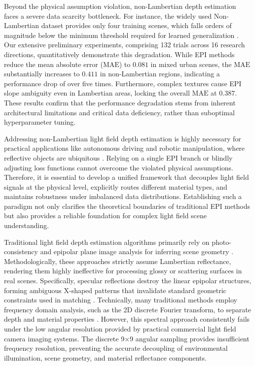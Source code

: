 \documentclass[lettersize,journal]{IEEEtran}
\begin{document}
Beyond the physical assumption violation, non-Lambertian depth estimation faces a severe data scarcity bottleneck. For instance, the widely used Non-Lambertian dataset provides only four training scenes, which falls orders of magnitude below the minimum threshold required for learned generalization \cite{non_lambertian_dataset, data_scarcity}. Our extensive preliminary experiments, comprising 132 trials across 16 research directions, quantitatively demonstrate this degradation. While EPI methods reduce the mean absolute error ($\text{MAE}$) to $0.081$ in mixed urban scenes, the $\text{MAE}$ substantially increases to $0.411$ in non-Lambertian regions, indicating a performance drop of over five times. Furthermore, complex textures cause EPI slope ambiguity even in Lambertian areas, locking the overall $\text{MAE}$ at $0.387$. These results confirm that the performance degradation stems from inherent architectural limitations and critical data deficiency, rather than suboptimal hyperparameter tuning.

Addressing non-Lambertian light field depth estimation is highly necessary for practical applications like autonomous driving and robotic manipulation, where reflective objects are ubiquitous \cite{autonomous_driving, robotic_manipulation}. Relying on a single EPI branch or blindly adjusting loss functions cannot overcome the violated physical assumptions. Therefore, it is essential to develop a unified framework that decouples light field signals at the physical level, explicitly routes different material types, and maintains robustness under imbalanced data distributions. Establishing such a paradigm not only clarifies the theoretical boundaries of traditional EPI methods but also provides a reliable foundation for complex light field scene understanding.

Traditional light field depth estimation algorithms primarily rely on photo-consistency and epipolar plane image analysis for inferring scene geometry \cite{traditional_lf_depth, epi_analysis}. Methodologically, these approaches strictly assume Lambertian reflectance, rendering them highly ineffective for processing glossy or scattering surfaces in real scenes. Specifically, specular reflections destroy the linear epipolar structures, forming ambiguous X-shaped patterns that invalidate standard geometric constraints used in matching \cite{x_shaped_patterns, geometric_constraints}. Technically, many traditional methods employ frequency domain analysis, such as the 2D discrete Fourier transform, to separate depth and material properties \cite{2d_dft, frequency_analysis}. However, this spectral approach consistently fails under the low angular resolution provided by practical commercial light field camera imaging systems. The discrete 9$\times$9 angular sampling provides insufficient frequency resolution, preventing the accurate decoupling of environmental illumination, scene geometry, and material reflectance components.
\end{document}
